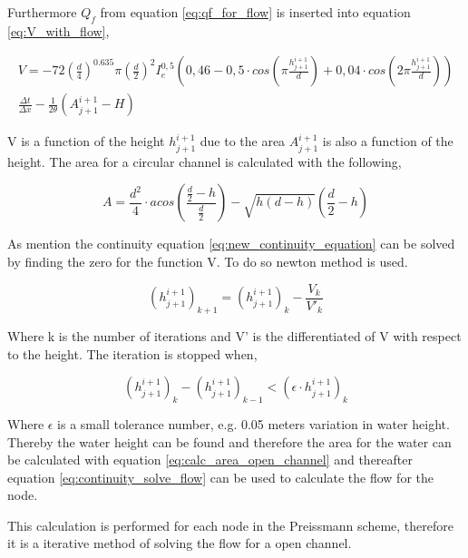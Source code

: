 Furthermore $Q_f$ from equation \ref{eq:qf_for_flow} is inserted into equation \ref{eq:V_with_flow}, 

\begin{multline}\label{eq:new_continuity_equation}
	V = -72\left(\frac{d}{4}\right)^{0.635}\pi\left(\frac{d}{2}\right)^2I_e^{0,5} \left(0,46-0,5\cdot cos\left(\pi \frac{h_{j+1}^{i+1}}{d}\right)+ 0,04\cdot cos\left(2\pi\frac{h_{j+1}^{i+1}}{d}\right)\right)\\ \frac{\Delta t}{\Delta x}-\frac{1}{2\theta}\left(A_{j+1}^{i+1}-H\right)
\end{multline}

V is a function of the height $h_{j+1}^{i+1}$ due to the area $A_{j+1}^{i+1}$ is also a function of the height. The area for a circular channel is calculated with the following,

\begin{equation}\label{eq:calc_area_open_channel}
	A = \frac {d^2}{4} \cdot acos \left(\frac{\frac{d}{2}-h}{\frac{d}{2}}\right)-\sqrt{h (d-h)} \left(\frac{d}{2}-h\right)
\end{equation}

As mention the continuity equation \ref{eq:new_continuity_equation} can be solved by finding the zero for the function V. To do so newton method is used.

\begin{equation}
	 (h_{j+1}^{i+1})_{k+1} =(h_{j+1}^{i+1})_{k} - \frac{V_k}{V'_k} 
\end{equation}  

Where k is the number of iterations and V' is the differentiated of V with respect to the height. The iteration is stopped when,

\begin{equation}
	(h_{j+1}^{i+1})_{k}-(h_{j+1}^{i+1})_{k-1} < (\epsilon \cdot h_{j+1}^{i+1})_{k}
\end{equation}

Where $\epsilon$ is a small tolerance number, e.g. 0.05 meters variation in water height. Thereby the water height can be found and therefore the area for the water can be calculated with equation \ref{eq:calc_area_open_channel}  and thereafter equation \ref{eq:continuity_solve_flow} can be used to calculate the flow for the node.  

This calculation is performed for each node in the Preissmann scheme, therefore it is a iterative method of solving the flow for a open channel. 


